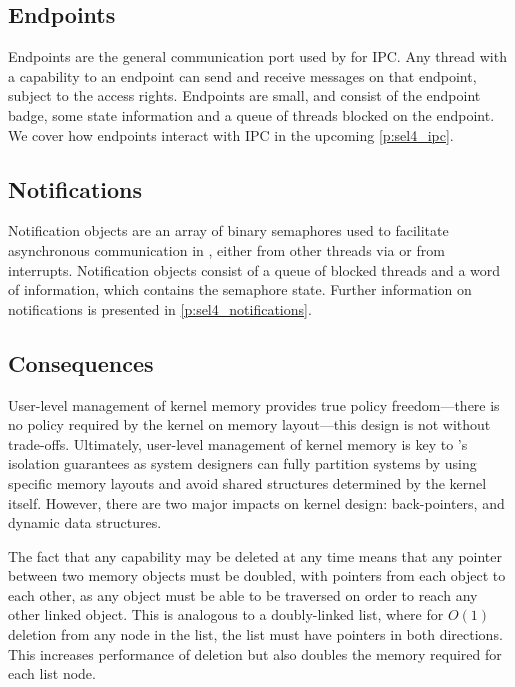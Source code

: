 \subsection{Endpoints}
\label{s:endpoints}

Endpoints are the general communication port used by \selfour for \gls{IPC}.
Any thread with a
capability to an endpoint can send and receive messages on that endpoint, subject to the access
rights. Endpoints are small, and consist of the endpoint badge, some state information and a queue
of threads blocked on the endpoint. We cover how endpoints interact with IPC in the upcoming
\cref{p:sel4_ipc}. 

\subsection{Notifications}

Notification objects are an array of binary semaphores used to facilitate asynchronous communication in \selfour, either from other threads via \send or from
interrupts. Notification objects consist of a queue of blocked threads and a word of information,
which contains the semaphore state. Further information on notifications is presented in
\cref{p:sel4_notifications}. 

\subsection{Consequences}

User-level management of kernel memory provides true policy freedom---there is no
policy required by the kernel on memory layout---this design is not without trade-offs. Ultimately,
user-level management of kernel memory is key to \selfour's isolation
guarantees as system designers can fully partition systems by using specific memory layouts and
avoid shared structures determined by the kernel itself. However, there are two major impacts on kernel 
design: back-pointers, and dynamic data structures. 

The fact that any capability may be deleted at any time means that any pointer between two memory
objects must be doubled, with pointers from each object to each other, as any object must be able to be
traversed on order to reach any other linked object. This is analogous to a doubly-linked list,
where for $O(1)$ deletion from any node in the list, the list must have pointers in both directions.
This increases performance of deletion but also doubles the memory required for each list node. 

